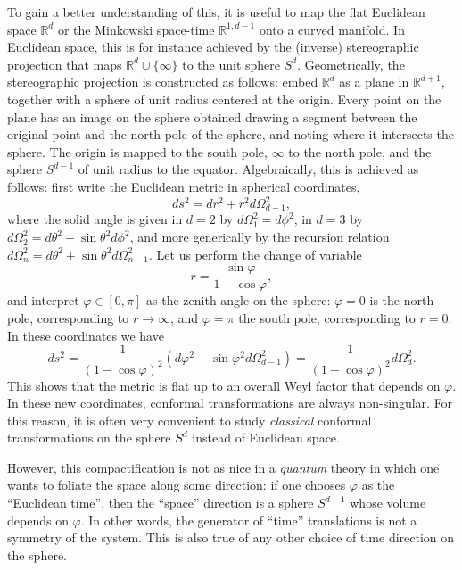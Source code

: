 \documentclass[a4paper,12pt]{article}
\numberwithin{equation}{section}
\begin{document}
To gain a better understanding of this, it is useful to map the flat Euclidean space $\mathbb{R}^d$ or the Minkowski space-time $\mathbb{R}^{1,d-1}$ onto a curved manifold.
In Euclidean space, this is for instance achieved by the (inverse) stereographic projection that maps $\mathbb{R}^d \cup \{ \infty \}$ to the unit sphere $S^d$.
Geometrically, the stereographic projection is constructed as follows: embed $\mathbb{R}^d$ as a plane in $\mathbb{R}^{d+1}$, together with a sphere of unit radius centered at the origin. Every point on the plane has an image on the sphere obtained drawing a segment between the original point and the north pole of the sphere, and noting where it intersects the sphere. The origin is mapped to the south pole, $\infty$ to the north pole, and the sphere $S^{d-1}$ of unit radius to the equator.
Algebraically, this is achieved as follows: first write the Euclidean metric in spherical coordinates,
\begin{equation}
	ds^2 = dr^2 + r^2 d\Omega_{d-1}^2,
\end{equation}
where the solid angle is given in $d = 2$ by $d\Omega_1^2 = d\phi^2$, in $d = 3$ by $d\Omega_2^2 = d\theta^2 + \sin\theta^2 d\phi^2$, and more generically by the recursion relation $d\Omega_n^2 = d\theta^2 + \sin\theta^2 d\Omega_{n-1}^2$.
Let us perform the change of variable
\begin{equation}
	r = \frac{\sin\varphi}{1 - \cos\varphi},
\end{equation}
and interpret $\varphi \in [0, \pi]$ as the zenith angle on the sphere:
$\varphi = 0$ is the north pole, corresponding to $r \to \infty$, and $\varphi = \pi$ the south pole, corresponding to $r = 0$. In these coordinates we have
\begin{equation}
	ds^2 = \frac{1}{(1 - \cos\varphi)^2}
	\left( d\varphi^2 + \sin\varphi^2 d\Omega_{d-1}^2 \right)
	= \frac{1}{(1 - \cos\varphi)^2} d\Omega_d^2.
\end{equation}
This shows that the metric is flat up to an overall Weyl factor that depends on $\varphi$.
In these new coordinates, conformal transformations are always non-singular. 
For this reason, it is often very convenient to study \emph{classical} conformal transformations on the sphere $S^d$ instead of Euclidean space.

However, this compactification is not as nice in a \emph{quantum} theory in which one wants to foliate the space along some direction: if one chooses $\varphi$ as the ``Euclidean time'', then the ``space'' direction is a sphere $S^{d-1}$ whose volume depends on $\varphi$. In other words, the generator of ``time'' translations is not a symmetry of the system. This is also true of any other choice of time direction on the sphere.
\end{document}
